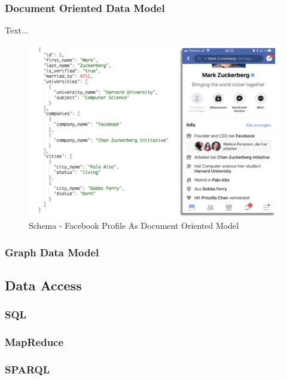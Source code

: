 {\subsubsection{Document Oriented Data Model}
\label{tf_dma_datamodels_dodm}

Text...

\begin{figure}[ht]
	\centering
  \includegraphics[width=1\textwidth]{document_oriented_data_model_zuckerberg.png}
	\caption{Schema - Facebook Profile As Document Oriented Model}
	\label{schema_facebook_document_oriented_model}
\end{figure}


\subsubsection{Graph Data Model}
\label{tf_dma_datamodels_gdm}

\subsection{Data Access}
\label{tf_dma_dataaccess}

\subsubsection{SQL}
\label{tf_dma_dataaccess_sql}

\subsubsection{MapReduce}
\label{tf_dma_dataaccess_mr}

\subsubsection{SPARQL}
\label{tf_dma_dataaccess_sparql}

}

